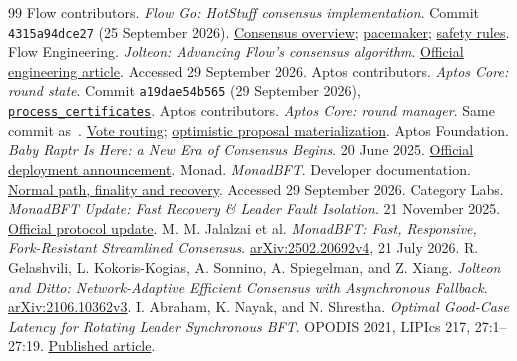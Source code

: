 \documentclass[11pt,a4paper,onecolumn]{article}
\newcounter{protocol}
\begin{document}
\begin{thebibliography}{99}
Flow contributors. \emph{Flow Go: HotStuff consensus implementation}.
Commit \texttt{4315a94dce27} (25 September 2026).
\href{https://github.com/onflow/flow-go/blob/4315a94dce27b0a5da53103bd1f1f519ba4506ca/consensus/hotstuff/README.md}{Consensus overview};
\href{https://github.com/onflow/flow-go/blob/4315a94dce27b0a5da53103bd1f1f519ba4506ca/consensus/hotstuff/pacemaker/pacemaker.go}{pacemaker};
\href{https://github.com/onflow/flow-go/blob/4315a94dce27b0a5da53103bd1f1f519ba4506ca/consensus/hotstuff/safetyrules/safety_rules.go}{safety rules}.
Flow Engineering. \emph{Jolteon: Advancing Flow's consensus algorithm}.
\href{https://flow.com/engineering-blogs/jolteon-advancing-flows-consensus-algorithm}{Official engineering article}. Accessed 29 September 2026.
Aptos contributors. \emph{Aptos Core: round state}.
Commit \texttt{a19dae54b565} (29 September 2026),
\href{https://github.com/aptos-labs/aptos-core/blob/a19dae54b5657cdf7abbd9907f465553cdff07f4/consensus/src/liveness/round_state.rs#L245-L288}{\texttt{process\_certificates}}.
Aptos contributors. \emph{Aptos Core: round manager}.
Same commit as~\cite{aptosround}.
\href{https://github.com/aptos-labs/aptos-core/blob/a19dae54b5657cdf7abbd9907f465553cdff07f4/consensus/src/round_manager.rs#L1551-L1573}{Vote routing};
\href{https://github.com/aptos-labs/aptos-core/blob/a19dae54b5657cdf7abbd9907f465553cdff07f4/consensus/src/round_manager.rs#L965-L986}{optimistic proposal materialization}.
Aptos Foundation. \emph{Baby Raptr Is Here: a New Era of Consensus Begins}.
20 June 2025.
\href{https://aptosnetwork.com/currents/baby-raptr-lands-on-mainnet}{Official deployment announcement}.
Monad. \emph{MonadBFT}. Developer documentation.
\href{https://docs.monad.xyz/monad-arch/consensus/monad-bft}{Normal path, finality and recovery}. Accessed 29 September 2026.
Category Labs. \emph{MonadBFT Update: Fast Recovery \& Leader Fault Isolation}.
21 November 2025.
\href{https://www.category.xyz/blogs/monadbft-update-fast-recovery-leader-fault-isolation}{Official protocol update}.
M. M. Jalalzai et al.
\emph{MonadBFT: Fast, Responsive, Fork-Resistant Streamlined Consensus}.
\href{https://arxiv.org/abs/2502.20692v4}{arXiv:2502.20692v4}, 21 July 2026.
R. Gelashvili, L. Kokoris-Kogias, A. Sonnino, A. Spiegelman, and Z. Xiang.
\emph{Jolteon and Ditto: Network-Adaptive Efficient Consensus with Asynchronous Fallback}.
\href{https://arxiv.org/abs/2106.10362v3}{arXiv:2106.10362v3}.
I. Abraham, K. Nayak, and N. Shrestha.
\emph{Optimal Good-Case Latency for Rotating Leader Synchronous BFT}.
OPODIS 2021, LIPIcs 217, 27:1--27:19.
\href{https://doi.org/10.4230/LIPIcs.OPODIS.2021.27}{Published article}.
\end{thebibliography}
\end{document}
